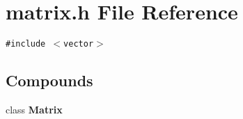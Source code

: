 \section{matrix.h File Reference}
\label{matrix_8h}
{\tt \#include $<$vector$>$}\par
\subsection*{Compounds}
\begin{CompactItemize}
\item 
class {\bf Matrix}
\end{CompactItemize}
